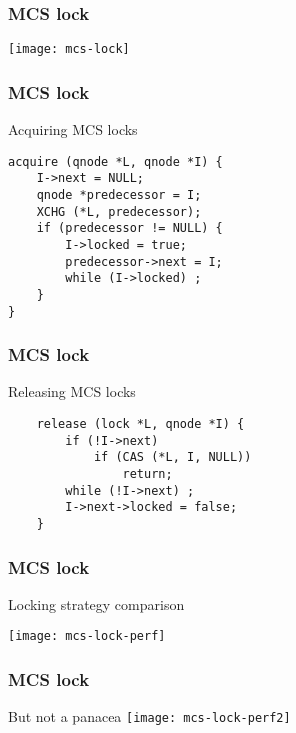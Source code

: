 \begin{frame}[fragile]
    \frametitle{MCS lock}
\centering
\texttt{[image: mcs-lock]}
\end{frame}



\begin{frame}[fragile]
    \frametitle{MCS lock}
    \Large
     Acquiring MCS locks
       
        \begin{block}{}
            \begin{verbatim}
acquire (qnode *L, qnode *I) {
    I->next = NULL;
    qnode *predecessor = I;
    XCHG (*L, predecessor);
    if (predecessor != NULL) {
        I->locked = true;
        predecessor->next = I;
        while (I->locked) ;
    }
}
\end{verbatim}
        \end{block}         

\end{frame}


\begin{frame}[fragile]
    \frametitle{MCS lock}
    \Large
    Releasing MCS locks
    
    \begin{block}{}
        \begin{verbatim}
    release (lock *L, qnode *I) {
        if (!I->next)
            if (CAS (*L, I, NULL))
                return;
        while (!I->next) ;
        I->next->locked = false;
    }
\end{verbatim}
    \end{block}         
    
\end{frame}


\begin{frame}[fragile]
    \frametitle{MCS lock}
    \centering
    Locking strategy comparison
    
    \texttt{[image: mcs-lock-perf]}
\end{frame}

\begin{frame}[fragile]
    \frametitle{MCS lock}
    \centering
    But not a  panacea
    \texttt{[image: mcs-lock-perf2]}
\end{frame}
